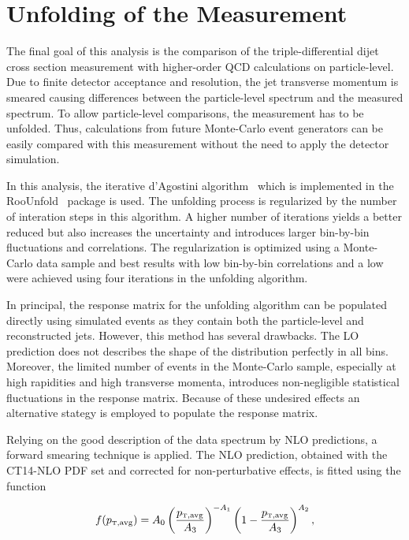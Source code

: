 \section{Unfolding of the Measurement}
\label{sec:unfolding}

The final goal of this analysis is the comparison of the triple-differential
dijet cross section measurement with higher-order QCD calculations on
particle-level. Due to finite detector acceptance and resolution, the jet
transverse momentum is smeared causing differences between the particle-level
\ptavg spectrum and the measured spectrum. To allow particle-level comparisons,
the measurement has to be unfolded. Thus, calculations from future Monte-Carlo
event generators can be easily compared with this measurement without the need to
apply the detector simulation.

In this analysis, the iterative d'Agostini algorithm~\cite{DAgostini:1994zf}
which is implemented in the RooUnfold~\cite{Adye:2011gm} package is used. The
unfolding process is regularized by the number of interation steps in this
algorithm. A higher number of iterations yields a better reduced \chisq but also
increases the uncertainty and introduces larger bin-by-bin fluctuations and
correlations.  The regularization is optimized using a Monte-Carlo data sample
and best results with low bin-by-bin correlations and a low \chisq were achieved
using four iterations in the unfolding algorithm.

In principal, the response matrix for the unfolding algorithm can be populated
directly using simulated events as they contain both the particle-level and
reconstructed jets. However, this method has several drawbacks. The LO
prediction does not describes the shape of the distribution perfectly in all
bins. Moreover, the limited number of events in the Monte-Carlo sample, especially at high
rapidities and high transverse momenta, introduces non-negligible statistical
fluctuations in the response matrix. Because of these undesired effects an
alternative stategy is employed to populate the response matrix.

Relying on the good description of the data spectrum by NLO predictions, a forward
smearing technique is applied. The NLO prediction, obtained with the CT14-NLO PDF
set and corrected for non-perturbative effects, is fitted using the function

\begin{equation}
    f(\ptavg) = A_0 \left(
    \frac{\ptavg}{A_3}\right)^{-A_1}\left(1-\frac{\ptavg}{A_3}\right)^{A_2},
\end{equation}

